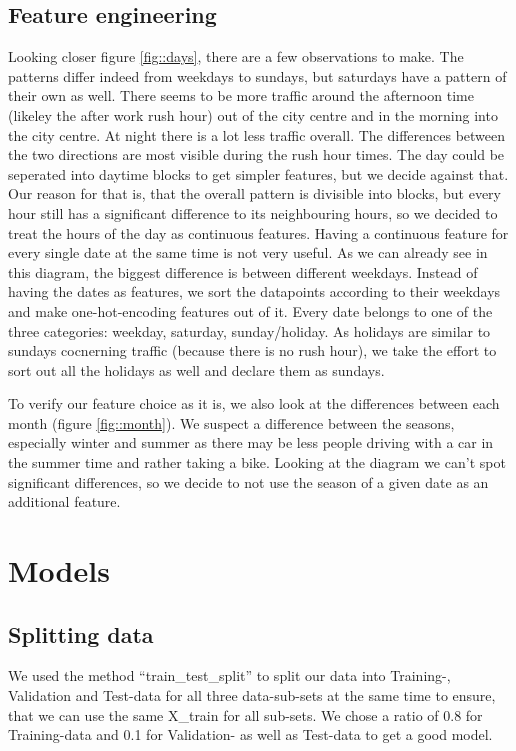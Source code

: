 \documentclass[12pt,a4paper]{scrartcl}		%
\begin{document}
\subsection{Feature engineering}
Looking closer figure \ref{fig::days}, there are a few observations to make. 
The patterns differ indeed from weekdays to sundays, but saturdays have a pattern of their own as well.
There seems to be more traffic around the afternoon time (likeley the after work rush hour) out of the city centre 
and in the morning into the city centre. At night there is a lot less traffic overall.
The differences between the two directions are most visible during the rush hour times. 
The day could be seperated into daytime blocks to get simpler features, but we decide against that. 
Our reason for that is, that the overall pattern is divisible into blocks, but every hour still has a significant
difference to its neighbouring hours, so we decided to treat the hours of the day as continuous features.
Having a continuous feature for every single date at the same time is not very useful. As we can already see in this 
diagram, the biggest difference is between different weekdays. 
Instead of having the dates as features, we sort the datapoints according to their weekdays and make one-hot-encoding 
features out of it. Every date belongs to one of the three categories: weekday, saturday, sunday/holiday.
As holidays are similar to sundays cocnerning traffic (because there is no rush hour), we take the effort to sort out 
all the holidays as well and declare them as sundays.

To verify our feature choice as it is, we also look at the differences between each month (figure \ref{fig::month}).
We suspect a difference between the seasons, especially winter and summer as there may be less people driving with a car 
in the summer time and rather taking a bike. Looking at the diagram we can't spot significant differences, so we decide 
to not use the season of a given date as an additional feature.

\section{Models}
\subsection{Splitting data}
We used the method “train\_test\_split” to split our data into Training-, Validation and Test-data for all three data-sub-sets 
at the same time to ensure, that we can use the same X\_train for all sub-sets. We chose a ratio of 0.8 for Training-data and 
0.1 for Validation- as well as Test-data to get a good model. 
\end{document}
